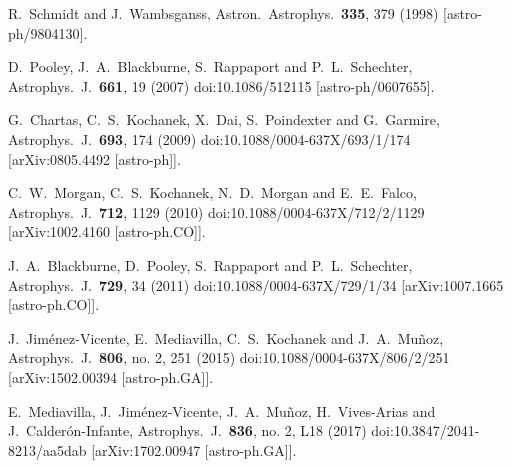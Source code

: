 \documentclass[showpacs,twocolumn,preprintnumbers,amsmath,amssymb,superscriptaddress,nofootinbib]{revtex4}
\begin{document}
\begin{thebibliography}{0}
  R.~Schmidt and J.~Wambsganss,
  Astron.\ Astrophys.\  {\bf 335}, 379 (1998)
  [astro-ph/9804130].

  D.~Pooley, J.~A.~Blackburne, S.~Rappaport and P.~L.~Schechter,
  Astrophys.\ J.\  {\bf 661}, 19 (2007)
  doi:10.1086/512115
  [astro-ph/0607655].

  G.~Chartas, C.~S.~Kochanek, X.~Dai, S.~Poindexter and G.~Garmire,
  Astrophys.\ J.\  {\bf 693}, 174 (2009)
  doi:10.1088/0004-637X/693/1/174
  [arXiv:0805.4492 [astro-ph]].

  C.~W.~Morgan, C.~S.~Kochanek, N.~D.~Morgan and E.~E.~Falco,
  Astrophys.\ J.\  {\bf 712}, 1129 (2010)
  doi:10.1088/0004-637X/712/2/1129
  [arXiv:1002.4160 [astro-ph.CO]].

  J.~A.~Blackburne, D.~Pooley, S.~Rappaport and P.~L.~Schechter,
  Astrophys.\ J.\  {\bf 729}, 34 (2011)
  doi:10.1088/0004-637X/729/1/34
  [arXiv:1007.1665 [astro-ph.CO]].

  J.~Jim\'{e}nez-Vicente, E.~Mediavilla, C.~S.~Kochanek and J.~A.~Mu\~{n}oz,
  Astrophys.\ J.\  {\bf 806}, no. 2, 251 (2015)
  doi:10.1088/0004-637X/806/2/251
  [arXiv:1502.00394 [astro-ph.GA]].
  
  E.~Mediavilla, J.~Jim\'{e}nez-Vicente, J.~A.~Mu\~{n}oz, H.~Vives-Arias and J.~Calder\'{o}n-Infante,
  Astrophys.\ J.\  {\bf 836}, no. 2, L18 (2017)
  doi:10.3847/2041-8213/aa5dab
  [arXiv:1702.00947 [astro-ph.GA]].


\end{thebibliography}
\end{document}
